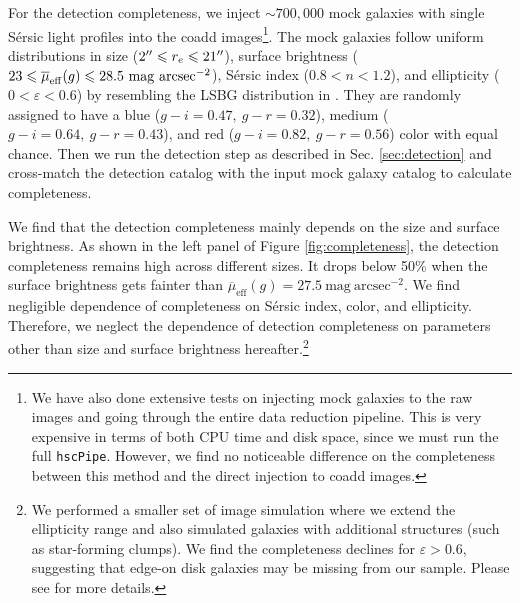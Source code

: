 \documentclass[twocolumn,astrosymb,twocolappendix]{aastex631}
\newcommand{\sbunit}{\mathrm{mag\ arcsec}^{-2}}
\newcommand{\sbeff}{\overline{\mu}_{\mathrm{eff}}(g)}
\newcommand{\code}[1]{\texttt{#1}}
\newcommand{\sersic}{S\'ersic}
\begin{document}
\begin{CJK*}{UTF8}{gbsn}
For the detection completeness, we inject $\sim 700,000$ mock galaxies with single \sersic{} light profiles \citep{Sersic1963} into the coadd images\footnote{We have also done extensive tests on injecting mock galaxies to the raw images and going through the entire data reduction pipeline. This is very expensive in terms of both CPU time and disk space, since we must run the full \code{hscPipe}. However, we find no noticeable difference on the completeness between this method and the direct injection to coadd images.}. The mock galaxies follow uniform distributions in size ($2\mbox{$^{\prime\prime}$} \leqslant r_{e} \leqslant 21\mbox{$^{\prime\prime}$}$), surface brightness ($23 \leqslant \overline{\mu}_{\rm eff}(g) \leqslant 28.5\ \mathrm{mag\ arcsec^{-2}}$), \sersic{} index ($0.8 < n < 1.2$), and ellipticity ($0 < \varepsilon < 0.6$) by resembling the LSBG distribution in . They are randomly assigned to have a blue ($g-i=0.47,\ g-r=0.32$), medium ($g-i=0.64,\ g-r=0.43$), and red ($g-i=0.82,\ g-r=0.56$) color with equal chance. Then we run the detection step as described in Sec. \ref{sec:detection} and cross-match the detection catalog with the input mock galaxy catalog to calculate completeness. 

We find that the detection completeness mainly depends on the size and surface brightness. As shown in the left panel of Figure \ref{fig:completeness}, the detection completeness remains high across different sizes. It drops below 50\% when the surface brightness gets fainter than $\sbeff = 27.5\ \sbunit$. We find negligible dependence of completeness on \sersic{} index, color, and ellipticity. Therefore, we neglect the dependence of detection completeness on parameters other than size and surface brightness hereafter.\footnote{We performed a smaller set of image simulation where we extend the ellipticity range and also simulated galaxies with additional structures (such as star-forming clumps). We find the completeness declines for $\varepsilon > 0.6$, suggesting that edge-on disk galaxies may be missing from our sample. Please see \citet{Greene2022} for more details.}



\end{CJK*}
\end{document}
